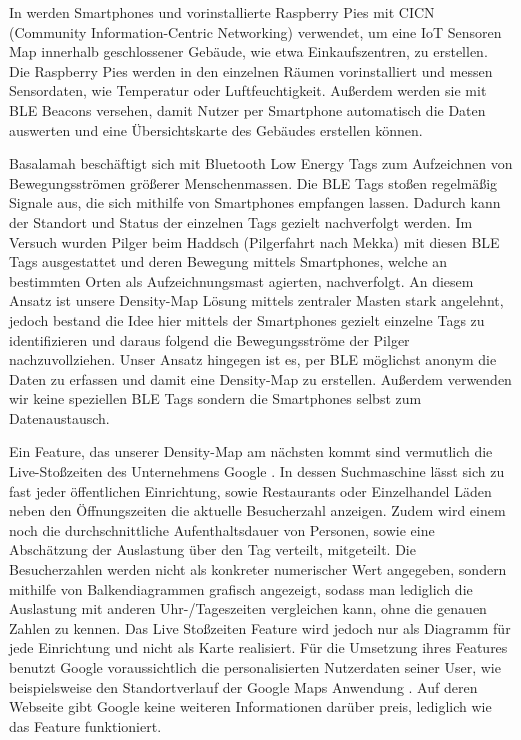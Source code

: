 \documentclass[conference,compsoc]{IEEEtran}
\begin{document}
In \cite{CICN} werden Smartphones und vorinstallierte Raspberry Pies mit CICN (Community Information-Centric Networking) verwendet,
um eine IoT Sensoren Map innerhalb geschlossener Gebäude, wie etwa Einkaufszentren, zu erstellen. 
Die Raspberry Pies werden in den einzelnen Räumen vorinstalliert und messen Sensordaten, wie Temperatur oder Luftfeuchtigkeit. 
Außerdem werden sie mit BLE Beacons versehen, damit Nutzer per Smartphone automatisch die Daten auswerten und eine Übersichtskarte des Gebäudes erstellen können.

Basalamah \cite{BLETags} beschäftigt sich mit Bluetooth Low Energy Tags zum Aufzeichnen von Bewegungsströmen größerer Menschenmassen.
Die BLE Tags stoßen regelmäßig Signale aus, die sich mithilfe von Smartphones empfangen lassen. 
Dadurch kann der Standort und Status der einzelnen Tags gezielt nachverfolgt werden. 
Im Versuch wurden Pilger beim Haddsch (Pilgerfahrt nach Mekka) mit diesen BLE Tags ausgestattet und deren Bewegung mittels Smartphones, welche an bestimmten Orten als Aufzeichnungsmast agierten, nachverfolgt. 
An diesem Ansatz ist unsere Density-Map Lösung mittels zentraler Masten stark angelehnt, jedoch bestand die Idee hier mittels der Smartphones gezielt einzelne Tags zu identifizieren und daraus folgend die Bewegungsströme der Pilger nachzuvollziehen. 
Unser Ansatz hingegen ist es, per BLE möglichst anonym die Daten zu erfassen und damit eine Density-Map zu erstellen. 
Außerdem verwenden wir keine speziellen BLE Tags sondern die Smartphones selbst zum Datenaustausch. 

Ein Feature, das unserer Density-Map am nächsten kommt sind vermutlich die Live-Stoßzeiten des Unternehmens Google \cite{GoogleStosszeiten}.  
In dessen Suchmaschine lässt sich zu fast jeder öffentlichen Einrichtung, sowie Restaurants oder Einzelhandel Läden neben den Öffnungszeiten die aktuelle Besucherzahl anzeigen. 
Zudem wird einem noch die durchschnittliche Aufenthaltsdauer von Personen, sowie eine Abschätzung der Auslastung über den Tag verteilt, mitgeteilt. 
Die Besucherzahlen werden nicht als konkreter numerischer Wert angegeben, sondern mithilfe von Balkendiagrammen grafisch angezeigt, sodass man lediglich die Auslastung mit anderen Uhr-/Tageszeiten vergleichen kann, ohne die genauen Zahlen zu kennen. 
Das Live Stoßzeiten Feature wird jedoch nur als Diagramm für jede Einrichtung und nicht als Karte realisiert.
Für die Umsetzung ihres Features benutzt Google voraussichtlich die personalisierten Nutzerdaten seiner User, wie beispielsweise den Standortverlauf der Google Maps Anwendung \cite{GoogleStandortverlauf}. 
Auf deren Webseite gibt Google keine weiteren Informationen darüber preis, lediglich wie das Feature funktioniert. 
\end{document}
